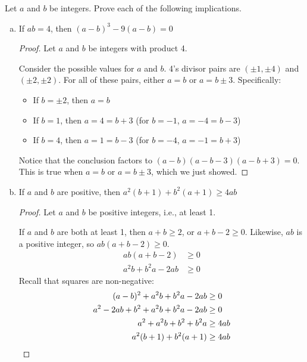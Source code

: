 \question Let $a$ and $b$ be integers. Prove each of the following implications.
\begin{enumerate}[(a)]
  \item If $ab = 4$, then $(a-b)^3 - 9(a-b) = 0$
        \begin{proof}
          Let $a$ and $b$ be integers with product 4.

          Consider the possible values for $a$ and $b$.
          4's divisor pairs are $(\pm 1, \pm 4)$ and $(\pm 2, \pm 2)$.
          For all of these pairs, either $a=b$ or $a=b\pm3$.
          Specifically:
          \begin{itemize}
            \item If $b=\pm2$, then $a=b$
            \item If $b=1$, then $a=4=b+3$ (for $b=-1$, $a=-4=b-3$)
            \item If $b=4$, then $a=1=b-3$ (for $b=-4$, $a=-1=b+3$)
          \end{itemize}

          Notice that the conclusion factors to $(a-b)(a-b-3)(a-b+3)=0$.
          This is true when $a=b$ or $a=b\pm3$, which we just showed.
        \end{proof}
  \item If $a$ and $b$ are positive, then $a^2(b+1) + b^2(a+1) \geq 4ab$
        \begin{proof}
          Let $a$ and $b$ be positive integers, i.e., at least 1.

          If $a$ and $b$ are both at least 1, then $a+b \geq 2$, or $a+b-2 \geq 0$.
          Likewise, $ab$ is a positive integer, so $ab(a+b-2) \geq 0$.
          \begin{align*}
            ab(a+b-2)         & \geq 0 \\
            a^2b + b^2a - 2ab & \geq 0
          \end{align*}
          Recall that squares are non-negative:
          \begin{align*}
            (a-b)^2 + a^2b + b^2a - 2ab         & \geq 0            \\
            a^2 - 2ab + b^2 + a^2b + b^2a - 2ab & \geq 0            \\
            a^2 + a^2b + b^2 + b^2a             & \geq 4ab          \\
            a^2(b+1) + b^2(a+1)                 & \geq 4ab \qedhere
          \end{align*}
        \end{proof}
\end{enumerate}



